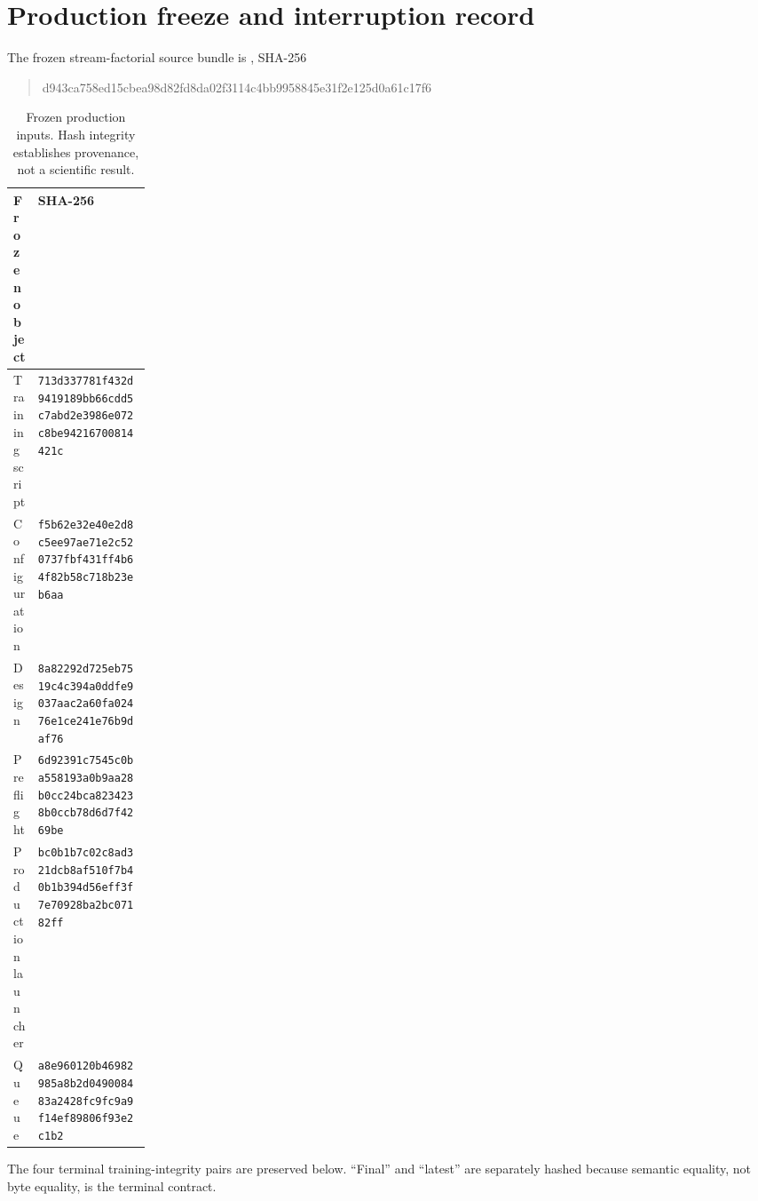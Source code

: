 \documentclass[11pt]{article}
\begin{document}
\section{Production freeze and interruption record}
The frozen stream-factorial source bundle is , SHA-256
\begin{quote}\ttfamily\small d943ca758ed15cbea98d82fd8da02f3114c4bb9958845e31f2e125d0a61c17f6\end{quote}

\begin{table}[H]
\centering\scriptsize
\begin{tabularx}{\linewidth}{@{}L{0.18\linewidth}Y@{}}
\toprule
Frozen object & SHA-256\\
\midrule
Training script & \texttt{713d337781f432d9419189bb66cdd5c7abd2e3986e072c8be94216700814421c}\\
Configuration & \texttt{f5b62e32e40e2d8c5ee97ae71e2c520737fbf431ff4b64f82b58c718b23eb6aa}\\
Design & \texttt{8a82292d725eb7519c4c394a0ddfe9037aac2a60fa02476e1ce241e76b9daf76}\\
Preflight & \texttt{6d92391c7545c0ba558193a0b9aa28b0cc24bca8234238b0ccb78d6d7f4269be}\\
Production launcher & \texttt{bc0b1b7c02c8ad321dcb8af510f7b40b1b394d56eff3f7e70928ba2bc07182ff}\\
Queue & \texttt{a8e960120b46982985a8b2d049008483a2428fc9fc9a9f14ef89806f93e2c1b2}\\
\bottomrule
\end{tabularx}
\caption{Frozen production inputs. Hash integrity establishes provenance, not a scientific result.}
\end{table}

The four terminal training-integrity pairs are preserved below. ``Final'' and ``latest'' are separately hashed because semantic equality, not byte equality, is the terminal contract.
\end{document}

